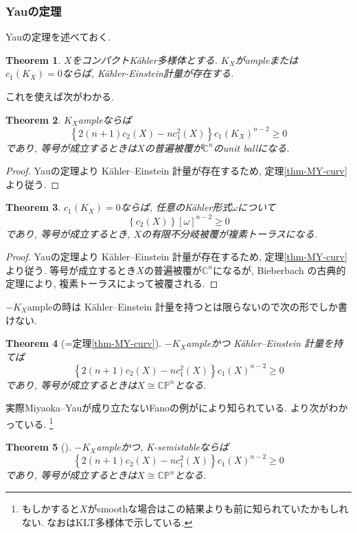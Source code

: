 \documentclass[dvipdfmx,a4paper,11pt]{article} %
\newtheorem{thm}{Theorem}[section]
\theoremstyle{definition}
\theoremstyle{remark}
\numberwithin{equation}{section}
\newcommand{\C}{\mathbb{C}}
\begin{document}
\subsubsection{Yauの定理}
Yauの定理\cite{Yau77}を述べておく.
\begin{thm}
$X$をコンパクトK\"ahler多様体とする. 
$K_X$がampleまたは$c_1(K_X)=0$ならば, K\"ahler-Einstein計量が存在する. 
\end{thm}

これを使えば次がわかる. 

\begin{thm}\cite{Yau77}
$K_X$ampleならば
\[
\left\{
2(n+1)c_2(X)-nc_{1}^{2}(X)
\right\}c_1(K_X)^{n-2}
\ge 0
\]
であり, 等号が成立するときは$X$の普遍被覆が$\C^n$のunit ballになる. 
\end{thm}
 \begin{proof}
 Yauの定理より Kähler--Einstein 計量が存在するため, 定理\ref{thm-MY-curv}より従う. 
 \end{proof}

\begin{thm}\cite{Yau77}
$c_1(K_X)=0$ならば, 任意のKähler形式$\omega$について
\[
\left\{
c_2(X)
\right\}[\omega]^{n-2}
\ge 0
\]
であり, 等号が成立するとき, $X$の有限不分岐被覆が複素トーラスになる. 
\end{thm}
 \begin{proof}
 Yauの定理より Kähler--Einstein 計量が存在するため, 定理\ref{thm-MY-curv}より従う. 
 等号が成立するとき$X$の普遍被覆が$\C^n$になるが, Bieberbach の古典的定理により, 複素トーラスによって被覆される.
 \end{proof}

$-K_X$ampleの時は Kähler--Einstein 計量を持つとは限らないので次の形でしか書けない. 
\begin{thm}[{=定理\ref{thm-MY-curv}}]
$-K_X$ampleかつ Kähler--Einstein 計量を持てば
\[
\left\{
2(n+1)c_2(X)-nc_{1}^{2}(X)
\right\}c_1(X)^{n-2}
\ge 0
\]
であり, 等号が成立するときは$X \cong \mathbb{C}\mathbb{P}^n$となる.
\end{thm}

実際Miyaoka--Yauが成り立たないFanoの例が\cite{GKP22}により知られている. 
\cite{GKP22, DGP24}より次がわかっている. \footnote{もしかすると$X$がsmoothな場合はこの結果よりも前に知られていたかもしれない. なお\cite{GKP22, DGP24}はKLT多様体で示している.}

\begin{thm}[{\cite{GKP22, DGP24}}]
$-K_X$ampleかつ, K-semistableならば
\[
\left\{
2(n+1)c_2(X)-nc_{1}^{2}(X)
\right\}c_1(X)^{n-2}
\ge 0
\]
であり, 等号が成立するときは$X \cong \mathbb{C}\mathbb{P}^n$となる.
\end{thm}
\end{document}
